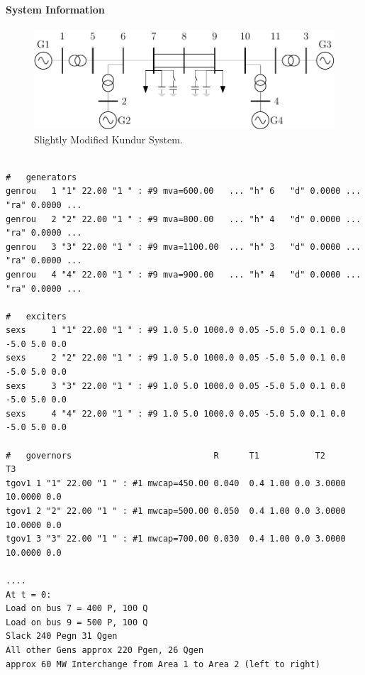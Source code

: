 \documentclass[12pt]{article}
\begin{document}
\paragraph{System Information}
\newcommand{\figW}{1}
	\begin{figure}[h!]
			\centering
			\includegraphics[width=\figW\linewidth]{kundur4LTD.pdf}\vspace{-.5em}
			\caption{Slightly Modified Kundur System.}
			\label{system}		 
	\end{figure}%
\begin{Verbatim}

#   generators
genrou   1 "1" 22.00 "1 " : #9 mva=600.00   ... "h" 6   "d" 0.0000 ... "ra" 0.0000 ...
genrou   2 "2" 22.00 "1 " : #9 mva=800.00   ... "h" 4   "d" 0.0000 ... "ra" 0.0000 ...
genrou   3 "3" 22.00 "1 " : #9 mva=1100.00  ... "h" 3   "d" 0.0000 ... "ra" 0.0000 ...
genrou   4 "4" 22.00 "1 " : #9 mva=900.00   ... "h" 4   "d" 0.0000 ... "ra" 0.0000 ...

#   exciters
sexs     1 "1" 22.00 "1 " : #9 1.0 5.0 1000.0 0.05 -5.0 5.0 0.1 0.0 -5.0 5.0 0.0
sexs     2 "2" 22.00 "1 " : #9 1.0 5.0 1000.0 0.05 -5.0 5.0 0.1 0.0 -5.0 5.0 0.0
sexs     3 "3" 22.00 "1 " : #9 1.0 5.0 1000.0 0.05 -5.0 5.0 0.1 0.0 -5.0 5.0 0.0
sexs     4 "4" 22.00 "1 " : #9 1.0 5.0 1000.0 0.05 -5.0 5.0 0.1 0.0 -5.0 5.0 0.0

#   governors                            R      T1           T2      T3
tgov1 1 "1" 22.00 "1 " : #1 mwcap=450.00 0.040  0.4 1.00 0.0 3.0000  10.0000 0.0
tgov1 2 "2" 22.00 "1 " : #1 mwcap=500.00 0.050  0.4 1.00 0.0 3.0000  10.0000 0.0
tgov1 3 "3" 22.00 "1 " : #1 mwcap=700.00 0.030  0.4 1.00 0.0 3.0000  10.0000 0.0

....
At t = 0:
Load on bus 7 = 400 P, 100 Q
Load on bus 9 = 500 P, 100 Q
Slack 240 Pegn 31 Qgen
All other Gens approx 220 Pgen, 26 Qgen
approx 60 MW Interchange from Area 1 to Area 2 (left to right)
\end{Verbatim}


\pagebreak
\newcommand{\caseName}{kundurStep}
\end{document}
